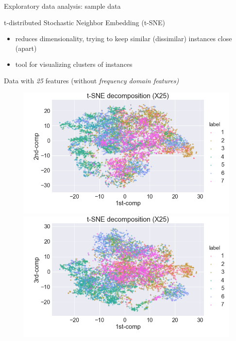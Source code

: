 \documentclass{if-beamer}
\begin{document}
\begin{frame}{Exploratory data analysis: sample data}

        \begin{block}{t-distributed Stochastic Neighbor Embedding (t-SNE)}    
        \begin{itemize}
                \item reduces dimensionality, trying to keep similar (dissimilar) instances close  (apart)
                \item tool for visualizing clusters of instances 
        \end{itemize}                 
        
         \begin{exampleblock}{Data with \emph{25} features (without \emph{frequency domain features)}}
            	 \begin{figure}
                    \includegraphics[scale=0.2]{./figs/tSNE12_X25.png}
                    \includegraphics[scale=0.2]{./figs/tSNE13_X25.png}
                    \end{figure} 
               \end{exampleblock}
   	 \end{block}
	
\end{frame}
 
\end{document}
